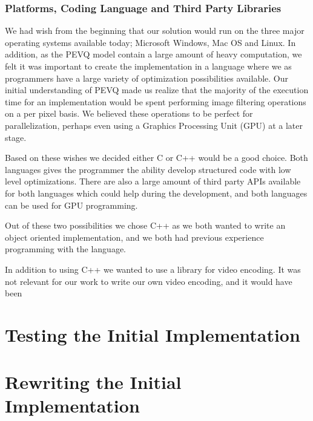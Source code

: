 \subsection{Platforms, Coding Language and Third Party Libraries}
We had wish from the beginning that our solution would run on the three major operating systems available today; Microsoft Windows, Mac OS and Linux. In addition, as the PEVQ model contain a large amount of heavy computation, we felt it was important to create the implementation in a language where we as programmers have a large variety of optimization possibilities available. Our initial understanding of PEVQ made us realize that the majority of the execution time for an implementation would be spent performing image filtering operations on a per pixel basis. We believed these operations to be perfect for parallelization, perhaps even using a Graphics Processing Unit (GPU) at a later stage.

Based on these wishes we decided either C or C++ would be a good choice. Both languages gives the programmer the ability develop structured code with low level optimizations. There are also a large amount of third party APIs available for both languages which could help during the development, and both languages can be used for GPU programming. 

Out of these two possibilities we chose C++ as we both wanted to write an object oriented implementation, and we both had previous experience programming with the language. 

In addition to using C++ we wanted to use a library for video encoding. It was not relevant for our work to write our own video encoding, and it would have been 



\chapter{Testing the Initial Implementation}
       


\chapter{Rewriting the Initial Implementation}




